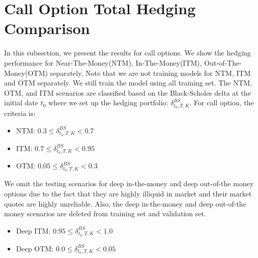\documentclass[letterpaper,12pt,titlepage,oneside,final]{book}
\numberwithin{equation}{section}
\theoremstyle{definition}
\begin{document}
\section{Call Option Total Hedging Comparison}
In this subsection, we present the results for call options. We show the hedging performance for Near-The-Money(NTM), In-The-Money(ITM), Out-of-The-Money(OTM) separately. Note that we are not training  models for NTM, ITM and OTM separately. We still train the model using all training set. The NTM, OTM, and ITM scenarios are classified based on the Black-Scholes delta at the initial date $t_0$ where we set up the hedging portfolio: $\delta^{BS}_{t_0,T,K}$. For call option, the criteria is:
\begin{itemize}
	\item  NTM: $0.3 \leq \delta^{BS}_{t_0,T,K} <0.7$
	\item  ITM: $0.7 \leq \delta^{BS}_{t_0,T,K} <0.95$
	\item  OTM:  $0.05 \leq \delta^{BS}_{t_0,T,K} <0.3$
\end{itemize}
We omit the testing scenarios for deep in-the-money and deep out-of-the money options due to the fact that they are highly illiquid in market and their market quotes are highly unreliable. Also, the deep in-the-money and deep out-of-the money scenarios are deleted from training set and validation set.
\begin{itemize}
	\item  Deep ITM: $0.95 \leq \delta^{BS}_{t_0,T,K} <1.0$
	\item  Deep OTM:  $0.0 \leq \delta^{BS}_{t_0,T,K} <0.05$
\end{itemize}
\end{document}
